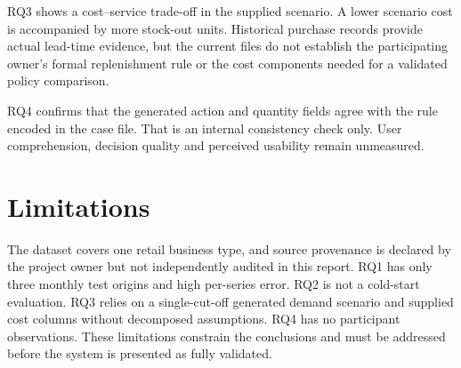 RQ3 shows a cost--service trade-off in the supplied scenario. A lower scenario cost is accompanied by more stock-out units. Historical purchase records provide actual lead-time evidence, but the current files do not establish the participating owner's formal replenishment rule or the cost components needed for a validated policy comparison.

RQ4 confirms that the generated action and quantity fields agree with the rule encoded in the case file. That is an internal consistency check only. User comprehension, decision quality and perceived usability remain unmeasured.

\section{Limitations}
The dataset covers one retail business type, and source provenance is declared by the project owner but not independently audited in this report. RQ1 has only three monthly test origins and high per-series error. RQ2 is not a cold-start evaluation. RQ3 relies on a single-cut-off generated demand scenario and supplied cost columns without decomposed assumptions. RQ4 has no participant observations. These limitations constrain the conclusions and must be addressed before the system is presented as fully validated.
